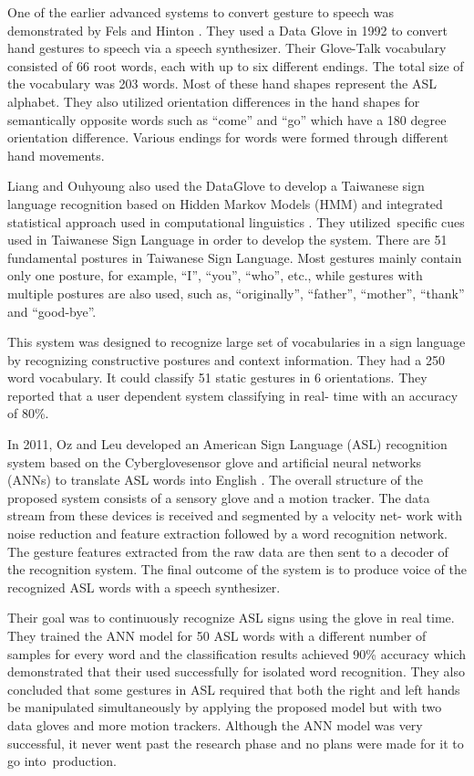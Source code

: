One of the earlier advanced systems to convert gesture to speech was demonstrated by Fels and Hinton \parencite{Fels1993}. They used a Data Glove in 1992 to convert hand gestures to speech via a speech synthesizer. Their Glove-Talk vocabulary consisted of 66 root words, each with up to six different endings. The total size of the vocabulary was 203 words. Most of these hand shapes represent the ASL alphabet. They also utilized orientation differences in the hand shapes for semantically opposite words such as ``come'' and ``go'' which have a 180 degree orientation difference. Various endings for words were formed through different hand movements. 

Liang and Ouhyoung also used the DataGlove to develop a Taiwanese sign language recognition based on Hidden Markov Models (HMM) and integrated statistical approach used in computational linguistics \parencite{Liang1998}. They utilized specific cues used in Taiwanese Sign Language in order to develop the system. There are 51 fundamental postures in Taiwanese Sign Language. Most gestures mainly contain only one posture, for example, ``I'', ``you'', ``who'', etc., while gestures with multiple postures are also used, such as, ``originally'', ``father'', ``mother'', ``thank'' and ``good-bye''. 

This system was designed to recognize large set of vocabularies in a sign language by recognizing constructive postures and context information. They had a 250 word vocabulary. It could classify 51 static gestures in 6 orientations. They reported that a user dependent system classifying in real- time with an accuracy of 80\%.

In 2011, Oz and Leu developed an American Sign Language (ASL) recognition system based on the Cyberglove\texttrademark sensor glove and artificial neural networks (ANNs) to translate ASL words into English \parencite{Oz2011}. The overall structure of the proposed system consists of a sensory glove and a motion tracker. The data stream from these devices is received and segmented by a velocity net- work with noise reduction and feature extraction followed by a word recognition network. The gesture features extracted from the raw data are then sent to a decoder of the recognition system. The final outcome of the system is to produce voice of the recognized ASL words with a speech synthesizer. 

Their goal was to continuously recognize ASL signs using the glove in real time. They trained the ANN model for 50 ASL words with a different number of samples for every word and the classification results achieved 90\% accuracy which demonstrated that their used successfully for isolated word recognition. They also concluded that some gestures in ASL required that both the right and left hands be manipulated simultaneously by applying the proposed model but with two data gloves and more motion trackers. Although the ANN model was very successful, it never went past the research phase and no plans were made for it to go into production. 

